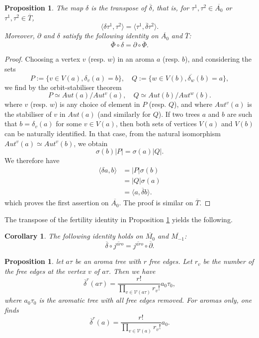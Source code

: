 \documentclass[a4paper,11pt]{article}
\newtheorem{proposition}[theorem]{Proposition}
\newtheorem{corollary}[theorem]{Corollary}
\begin{document}
\begin{proposition}
\label{prop:fertility_compatibility}
The map $\delta$ is the transpose of $\overline{\delta}$, that is, for $\tau^1,\tau^2\in \overline{A_0}$ or $\tau^1,\tau^2\in \overline{T}$,
\[
\langle \delta \tau^1, \tau^2\rangle=\langle \tau^1 , \overline{\delta} \tau^2 \rangle.
\]
Moreover, $\partial$ and $\delta$ satisfy the following identity on $\overline{A_0}$ and $\overline{T}$:
\[
\overline{\Phi}\circ \delta = \partial \circ \overline{\Phi}.
\]
\end{proposition}


\begin{proof}
Choosing a vertex $v$ (resp. $w$) in an aroma $a$ (resp. $b$), and considering the sets
\[P:= \{ v\in V(a), \delta_{v}(a)= b\}, \quad Q:= \{ w \in V(b), \overline{\delta_{w}}(b)=a\},\]
we find by the orbit-stabiliser theorem
\[ P \simeq Aut(a)/ Aut^v(a), \quad Q\simeq Aut(b)/ Aut^w(b).\]
where $v$ (resp. $w$) is any choice of element in $P$ (resp. $Q$), and where $Aut^v(a)$ is the stabiliser of $v$ in $Aut(a)$ (and similarly for $Q$). If two trees $a$ and $b$ are such that $b= \delta_v(a)$ for some $v\in V(a)$, then both sets of vertices $V(a)$ and $V(b)$ can be naturally identified. In that case, from the natural isomorphism $Aut^v(a)\simeq Aut^v(b)$, we obtain
\[\sigma(b)\vert P\vert = \sigma(a)\vert Q\vert.\]
We therefore have
\begin{align*}
    \langle \delta a, b\rangle
    &  = \vert P\vert \sigma(b)\\
& = \vert Q\vert \sigma(a)\\
& = \langle a, \overline{\delta} b\rangle.
\end{align*}
which proves the first assertion on $\overline{A_0}$. The proof is similar on $\overline{T}$.
\end{proof}


The transpose of the fertility identity in Proposition \ref{prop:fertility_compatibility} yields the following.
\begin{corollary}\label{deltabar-j}
The following identity holds on $\overline{M_0}$ and $\overline{M_{-1}}$:
\[
\overline{\delta}\circ \overline{j^{aro}}=\overline{j^{aro}}\circ\overline{\partial}.
\]
\end{corollary}


\begin{proposition}\label{delete-free-edges}
let $a\tau$ be an aroma tree with $r$ free edges. Let $r_v$ be the number of the free edges at the vertex $v$ of $a\tau$. Then we have
\[\overline{\delta}^r(a\tau)=\frac{r!}{\prod_{v\in \mathcal V(a\tau)}r_v!}a_0\tau_0,\]
where $a_0\tau_0$ is the aromatic tree with all free edges removed. For aromas only, one finds
\[\overline{\delta}^r(a)=\frac{r!}{\prod_{v\in \mathcal V(a)}r_v!}a_0.\]
\end{proposition}
\end{document}
